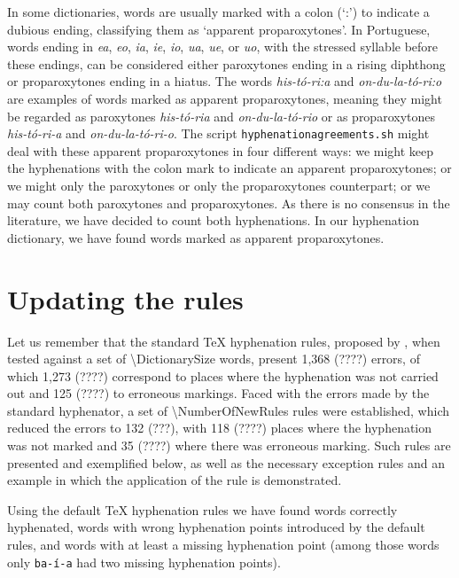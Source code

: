 \documentclass{article}
\begin{document}
In some dictionaries, words are usually marked with a colon (`:') to indicate a
dubious ending, classifying them as `apparent proparoxytones'. In Portuguese,
words ending in \emph{ea}, \emph{eo}, \emph{ia}, \emph{ie}, \emph{io},
\emph{ua}, \emph{ue}, or \emph{uo}, with the stressed syllable before these
endings, can be considered either paroxytones ending in a rising diphthong or
proparoxytones ending in a hiatus. The words \emph{his-tó-ri:a} and \emph{on-du-la-tó-ri:o}
are examples of words marked as apparent proparoxytones, meaning they might
be regarded as paroxytones \emph{his-tó-ria} and \emph{on-du-la-tó-rio} or
as proparoxytones \emph{his-tó-ri-a} and \emph{on-du-la-tó-ri-o}.
The script \texttt{hyphenationagreements.sh} might deal with these apparent proparoxytones
in four different ways: we might keep the hyphenations with the colon mark to
indicate an apparent proparoxytones; or we might only the paroxytones or only the proparoxytones
counterpart; or we may count both paroxytones and proparoxytones.
As there is no consensus in the literature, we have decided to count both
hyphenations. In our hyphenation dictionary, we have found \NumberOfAppProp{} words
marked as apparent proparoxytones.
 



\section{Updating the rules}
Let us remember that the standard \TeX{} hyphenation rules, proposed by
\textcite{rezende1987,hyphpt}, when tested against a set of \num{\DictionarySize}
words, present 1,368 (????) errors, of which 1,273 (????) correspond to places
where the hyphenation was not carried out and 125 (????) to erroneous markings.
Faced with the errors made by the standard hyphenator, a set of \num{\NumberOfNewRules} rules were
established, which reduced the errors to 132 (???), with 118 (????) places
where the hyphenation was not marked and 35 (????) where there was erroneous
marking. Such rules are presented and exemplified below, as well as the
necessary exception rules and an example in which the application of the rule
is demonstrated.




Using the default \TeX{} hyphenation rules we have found \NumberOfCorrectSix{}
words correctly hyphenated, \NumberOfWrongSix{} words with wrong hyphenation
points introduced by the default rules, and \NumberOfMissingSix{} words with at
least a missing hyphenation point (among those words only \texttt{ba-í-a} had
two missing hyphenation points).
\end{document}
